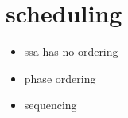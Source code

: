 \chapter{scheduling}



\begin{itemize}
	\item ssa has no ordering
	\item phase ordering
	\item sequencing
\end{itemize}
